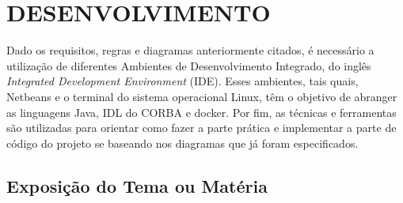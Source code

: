 \chapter{DESENVOLVIMENTO}

Dado os requisitos, regras e diagramas anteriormente citados, é necessário a
utilização de diferentes Ambientes de Desenvolvimento Integrado, do inglês \textit{Integrated
Development Environment} (IDE). Esses ambientes, tais quais, Netbeans e o terminal do sistema operacional Linux, têm o objetivo de abranger as linguagens Java, IDL do CORBA e docker. Por fim, as técnicas e ferramentas são utilizadas para orientar como fazer a parte
prática e implementar a parte de código do projeto se baseando nos diagramas que já foram
especificados.

\section{Exposição do Tema ou Matéria}


